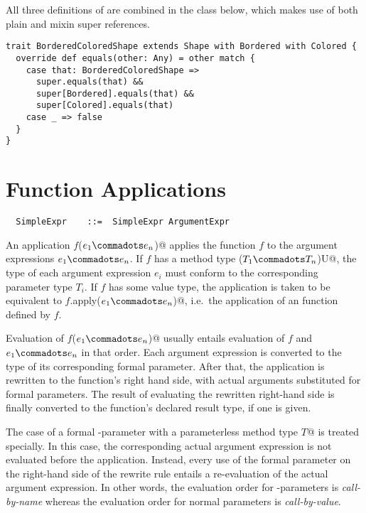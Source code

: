 \documentclass[a4paper,12pt,twoside,titlepage]{book}
\begin{document}
All three definitions of  are combined in the class
below, which makes use of both plain and mixin super references.
\begin{lstlisting}
trait BorderedColoredShape extends Shape with Bordered with Colored {
  override def equals(other: Any) = other match {
    case that: BorderedColoredShape => 
      super.equals(that) && 
      super[Bordered].equals(that) &&
      super[Colored].equals(that)
    case _ => false
  }
}
\end{lstlisting}

\section{Function Applications}
\label{sec:apply}

\syntax\begin{lstlisting}
  SimpleExpr    ::=  SimpleExpr ArgumentExpr
\end{lstlisting}

An application \lstinline@$f$($e_1 \commadots e_n$)@ applies the function $f$ to the
argument expressions $e_1 \commadots e_n$. If $f$ has a method type
\lstinline@($T_1 \commadots T_n$)U@, the type of each argument
expression $e_i$ must conform to the corresponding parameter type
$T_i$. If $f$ has some value type, the application is taken to be
equivalent to \lstinline@$f$.apply($e_1 \commadots e_n$)@, i.e.\ the
application of an  function defined by $f$.


Evaluation of \lstinline@$f$($e_1 \commadots e_n$)@ usually entails evaluation of
$f$ and $e_1 \commadots e_n$ in that order. Each argument expression
is converted to the type of its corresponding formal parameter.  After
that, the application is rewritten to the function's right hand side,
with actual arguments substituted for formal parameters.  The result
of evaluating the rewritten right-hand side is finally converted to
the function's declared result type, if one is given.

The case of a formal -parameter with a parameterless
method type \lstinline@[]$T$@ is treated specially. In this case, the
corresponding actual argument expression is not evaluated before the
application. Instead, every use of the formal parameter on the
right-hand side of the rewrite rule entails a re-evaluation of the
actual argument expression. In other words, the evaluation order for
-parameters is {\em call-by-name} whereas the evaluation
order for normal parameters is {\em call-by-value}.
\end{document}
